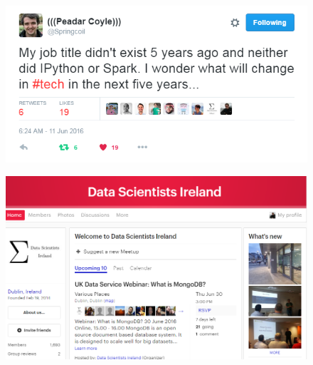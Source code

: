 \documentclass{beamer}
\begin{document}
	
	\begin{frame}
		\begin{figure}
\centering
\includegraphics[width=1.1\linewidth]{peadarcoyle}
\end{figure}

	\end{frame}
\begin{frame}
	\begin{figure}
\centering
\includegraphics[width=1.1\linewidth]{DSI}
\end{figure}

\end{frame}
\end{document}
